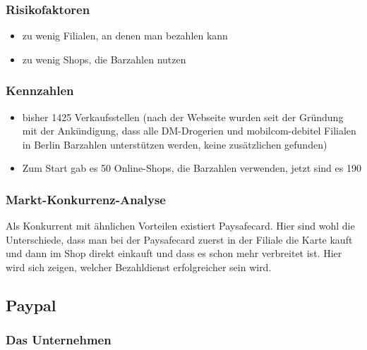 \begin{itemize}
\subsubsection{Risikofaktoren}
\begin{itemize}
\item zu wenig Filialen, an denen man bezahlen kann
\item zu wenig Shops, die Barzahlen nutzen
\end{itemize}
\subsubsection{Kennzahlen}
\begin{itemize}
\item bisher 1425 Verkaufsstellen (nach der Webseite wurden seit der Gründung mit der Ankündigung, dass alle DM-Drogerien
und mobilcom-debitel Filialen in Berlin Barzahlen unterstützen werden, keine zusätzlichen gefunden)
\item Zum Start gab es 50 Online-Shops, die Barzahlen verwenden, jetzt sind es 190
\end{itemize}
\subsubsection{Markt-Konkurrenz-Analyse}
Als Konkurrent mit ähnlichen Vorteilen existiert Paysafecard. Hier sind wohl die Unterschiede, dass man bei der
Paysafecard zuerst in der Filiale die Karte kauft und dann im Shop direkt einkauft und dass es schon mehr verbreitet ist.
Hier wird sich zeigen, welcher Bezahldienst erfolgreicher sein wird.

\subsection{Paypal}
\subsubsection{Das Unternehmen}


\end{itemize}
